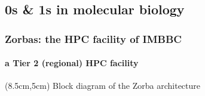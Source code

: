 \documentclass{beamer}
\begin{document}

   \begin{darkframes}
      \section{0s \& 1s in molecular biology}
   \end{darkframes}







   \begin{frame}
   
      \frametitle{Zorbas: the HPC facility of IMBBC}
      \framesubtitle{a Tier 2 (regional) HPC facility}
      

      \begin{textblock*}{3.5cm}(8.5cm,5cm)
         Block diagram of the Zorba architecture
      \end{textblock*}
   
   \end{frame}
\end{document}
